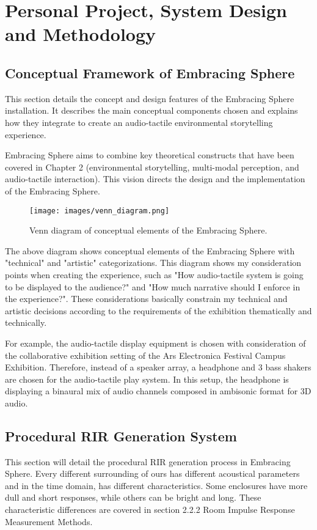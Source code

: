 \chapter{Personal Project, System Design and Methodology}
    \section{Conceptual Framework of Embracing Sphere}
        This section details the concept and design features of the Embracing Sphere installation. It describes the main conceptual components chosen and explains how they integrate to create an audio-tactile environmental storytelling experience.\par

        Embracing Sphere aims to combine key theoretical constructs that have been covered in Chapter 2 (environmental storytelling, multi-modal perception, and audio-tactile interaction). This vision directs the design and the implementation of the Embracing Sphere.\par

        \begin{figure}[H]
            \centering
            \texttt{[image: images/venn\_diagram.png]}
            \caption{Venn diagram of conceptual elements of the Embracing Sphere.}
            \label{fig:VENN}
        \end{figure}        

        The above diagram shows conceptual elements of the Embracing Sphere with "technical" and "artistic" categorizations. This diagram shows my consideration points when creating the experience, such as "How audio-tactile system is going to be displayed to the audience?" and "How much narrative should I enforce in the experience?". These considerations basically constrain my technical and artistic decisions according to the requirements of the exhibition thematically and technically.\par

        For example, the audio-tactile display equipment is chosen with consideration of the collaborative exhibition setting of the Ars Electronica Festival Campus Exhibition. Therefore, instead of a speaker array, a headphone and 3 bass shakers are chosen for the audio-tactile play system. In this setup, the headphone is displaying a binaural mix of audio channels composed in ambisonic format for 3D audio.\par
        \section{Procedural RIR Generation System}
            This section will detail the procedural RIR generation process in Embracing Sphere. Every different surrounding of ours has different acoustical parameters and in the time domain, has different characteristics. Some enclosures have more dull and short responses, while others can be bright and long. These characteristic differences are covered in section 2.2.2 Room Impulse Response Measurement Methods.\par

